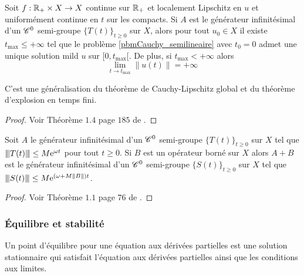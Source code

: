 \begin{theorem}\label{CauchyLipschitz_explosiontempsfini}
    Soit $f:\mathbb{R}_+ \times X \rightarrow X$ continue sur $\mathbb{R}_+$ et localement Lipschitz en $u$ et uniformément continue en $t$ sur les compacts. Si $A$ est le générateur infinitésimal d'un $\mathscr{C}^0$ semi-groupe $\big\{T(t)\big\}_{t \geq 0}$ sur $X$, alors pour tout $u_0 \in X$ il existe $t_{\max} \leq +\infty$ tel que le problème \eqref{pbmCauchy_semilineaire} avec $t_0=0$ admet une unique solution mild $u$ sur $[0,t_{\max}[$. De plus, si $t_{\max}<+\infty$ alors 
    \begin{equation*}
        \lim_{t \to t_{\max}}\|u(t)\| = +\infty
    \end{equation*}
\end{theorem}

\begin{remark}
    C'est une généralisation du théorème de Cauchy-Lipschitz global et du théorème d'explosion en temps fini.
\end{remark}

\begin{proof}
    Voir Théorème $1.4$ page $185$ de \cite{Pazy1983}.
\end{proof}

\begin{theorem}\label{thm_perturbation_operateur_borne}
    Soit $A$ le générateur infinitésimal d'un $\mathscr{C}^0$ semi-groupe $\big\{T(t)\big\}_{t \geq 0}$ sur $X$ tel que ${\left\vert\kern-0.25ex\left\vert \kern-0.25ex\left\vert T(t) \right\vert\kern-0.25ex\right\vert\kern-0.25ex\right\vert} \leq M\mathrm{e}^{\omega t}$ pour tout $t \geq 0$. Si $B$ est un opérateur borné sur $X$ alors $A+B$ est le générateur infinitésimal d'un $\mathscr{C}^0$ semi-groupe $\big\{S(t)\big\}_{t \geq 0}$ sur $X$ tel que ${\left\vert\kern-0.25ex\left\vert \kern-0.25ex\left\vert S(t) \right\vert\kern-0.25ex\right\vert\kern-0.25ex\right\vert} \leq M\mathrm{e}^{(\omega +M\|B\|)t}$.
\end{theorem}

\begin{proof}
    Voir Théorème $1.1$ page $76$ de \cite{Pazy1983}.
\end{proof}

\subsubsection{\'Equilibre et stabilité}
\begin{definition}
    Un \textcolor{astral}{point d'équilibre} pour une équation aux dérivées partielles est une solution stationnaire qui satisfait l'équation aux dérivées partielles ainsi que les conditions aux limites.
\end{definition}

